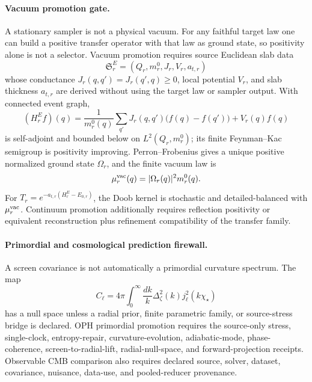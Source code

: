 \paragraph{Vacuum promotion gate.}
A stationary sampler is not a physical vacuum.  For any faithful target law one can build a
positive transfer operator with that law as ground state, so positivity alone is not a selector.
Vacuum promotion requires source Euclidean slab data
\[
\mathfrak S_r^E=(Q_r,m_r^0,J_r,V_r,a_{t,r})
\]
whose conductance \(J_r(q,q')=J_r(q',q)\ge0\), local potential \(V_r\), and slab thickness
\(a_{t,r}\) are derived without using the target law or sampler output.  With connected event graph,
\[
(H_r^Ef)(q)
=
\frac{1}{m_r^0(q)}
\sum_{q'}J_r(q,q')\bigl(f(q)-f(q')\bigr)
+
V_r(q)f(q)
\]
is self-adjoint and bounded below on \(L^2(Q_r,m_r^0)\); its finite Feynman--Kac semigroup is
positivity improving.  Perron--Frobenius gives a unique positive normalized ground state
\(\Omega_r\), and the finite vacuum law is
\[
\mu_r^{\rm vac}(q)=|\Omega_r(q)|^2m_r^0(q).
\]
For \(T_r=e^{-a_{t,r}(H_r^E-E_{0,r})}\), the Doob kernel is stochastic and detailed-balanced with
\(\mu_r^{\rm vac}\).  Continuum promotion additionally requires reflection positivity or
equivalent reconstruction plus refinement compatibility of the transfer family.

\paragraph{Primordial and cosmological prediction firewall.}
A screen covariance is not automatically a primordial curvature spectrum.  The map
\[
C_\ell
=
4\pi
\int_0^\infty
\frac{dk}{k}
\Delta_\zeta^2(k)j_\ell^2(k\chi_\star)
\]
has a null space unless a radial prior, finite parametric family, or source-stress bridge is
declared.  OPH primordial promotion requires the source-only stress, single-clock, entropy-repair,
curvature-evolution, adiabatic-mode, phase-coherence, screen-to-radial-lift, radial-null-space, and
forward-projection receipts. Observable CMB comparison also requires declared source, solver,
dataset, covariance, nuisance, data-use, and pooled-reducer provenance.

